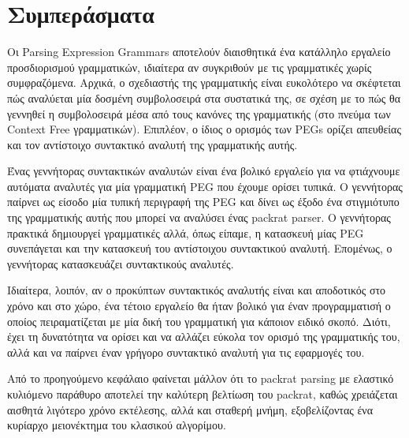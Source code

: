 \chapter{ Συμπεράσματα }
\label{ch:conclusions}

Οι Parsing Expression Grammars αποτελούν διαισθητικά ένα κατάλληλο εργαλείο προσδιορισμού γραμματικών, ιδιαίτερα αν συγκριθούν με τις γραμματικές χωρίς συμφραζόμενα. 
Αρχικά, ο σχεδιαστής της γραμματικής είναι ευκολότερο να σκέφτεται πώς αναλύεται μία δοσμένη συμβολοσειρά στα συστατικά της, σε σχέση με το πώς θα γεννηθεί η συμβολοσειρά μέσα από τους κανόνες της γραμματικής (στο πνεύμα των Context Free γραμματικών).
Επιπλέον, ο ίδιος ο ορισμός των PEGs ορίζει απευθείας και τον αντίστοιχο συντακτικό αναλυτή της γραμματικής αυτής.

Ένας γεννήτορας συντακτικών αναλυτών είναι ένα βολικό εργαλείο για να φτιάχνουμε αυτόματα αναλυτές για μία γραμματική PEG που έχουμε ορίσει τυπικά.
Ο γεννήτορας παίρνει ως είσοδο μία τυπική περιγραφή της PEG και δίνει ως έξοδο ένα στιγμιότυπο της γραμματικής αυτής που μπορεί να αναλύσει ένας packrat parser.
Ο γεννήτορας πρακτικά δημιουργεί γραμματικές αλλά, όπως είπαμε, η κατασκευή μίας PEG συνεπάγεται και την κατασκευή του αντίστοιχου συντακτικού αναλυτή.
Επομένως, ο γεννήτορας κατασκευάζει συντακτικούς αναλυτές.

Ιδιαίτερα, λοιπόν, αν ο προκύπτων συντακτικός αναλυτής είναι και αποδοτικός στο χρόνο και στο χώρο, ένα τέτοιο εργαλείο θα ήταν βολικό για έναν προγραμματισή ο οποίος πειραματίζεται με μία δική του γραμματική για κάποιον ειδικό σκοπό.
Διότι, έχει τη δυνατότητα να ορίσει και να αλλάζει εύκολα τον ορισμό της γραμματικής του, αλλά και να παίρνει έναν γρήγορο συντακτικό αναλυτή για τις εφαρμογές του.

Από το προηγούμενο κεφάλαιο φαίνεται μάλλον ότι το packrat parsing με ελαστικό κυλιόμενο παράθυρο αποτελεί την καλύτερη βελτίωση του packrat, καθώς χρειάζεται αισθητά λιγότερο χρόνο εκτέλεσης, αλλά και σταθερή μνήμη, εξοβελίζοντας ένα κυρίαρχο μειονέκτημα του κλασικού αλγορίμου.


